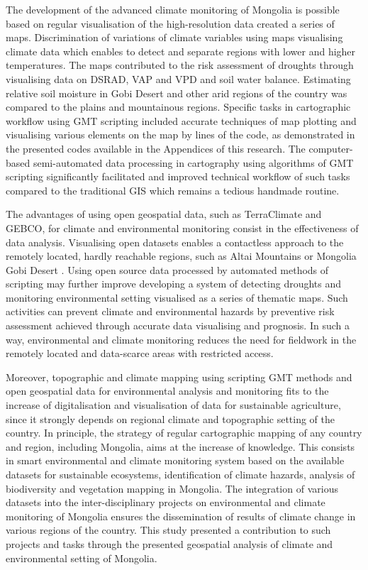 \documentclass[geosciences,article,submit,pdftex,moreauthors]{Definitions/mdpi}
\begin{document}
The development of the advanced climate monitoring of Mongolia is possible based on regular visualisation of the high-resolution data created a series of maps. Discrimination of variations of climate variables using maps visualising climate data which enables to detect and separate regions with lower and higher temperatures. The maps contributed to the risk assessment of droughts through visualising data on DSRAD, VAP and VPD and soil water balance. Estimating relative soil moisture in Gobi Desert and other arid regions of the country was compared to the plains and mountainous regions. Specific tasks in cartographic workflow using GMT scripting included accurate techniques of map plotting and visualising various elements on the map by lines of the code, as demonstrated in the presented codes available in the Appendices of this research. The computer-based semi-automated data processing in cartography using algorithms of GMT scripting significantly facilitated and improved technical workflow of such tasks compared to the traditional GIS which remains a tedious handmade routine. 

The advantages of using open geospatial data, such as TerraClimate and GEBCO, for climate and environmental monitoring consist in the effectiveness of data analysis. Visualising open datasets enables a contactless approach to the remotely located, hardly reachable regions, such as Altai Mountains or Mongolia Gobi Desert \cite{HEINER202078}. Using open source data processed by automated methods of scripting may further improve developing a system of detecting droughts and monitoring environmental setting visualised as a series of thematic maps. Such activities can prevent climate and environmental hazards by preventive risk assessment achieved through accurate data visualising and prognosis. In such a way, environmental and climate monitoring reduces the need for fieldwork in the remotely located and data-scarce areas with restricted access.

Moreover, topographic and climate mapping using scripting GMT methods and open geospatial data for environmental analysis and monitoring fits to the increase of digitalisation and visualisation of data for sustainable agriculture, since it strongly depends on regional climate and topographic setting of the country. In principle, the strategy of regular cartographic mapping of any country and region, including Mongolia, aims at the increase of knowledge. This consists in smart environmental and climate monitoring system based on the available datasets for sustainable ecosystems, identification of climate hazards, analysis of biodiversity and vegetation mapping in Mongolia. The integration of various datasets into the inter-disciplinary projects on environmental and climate monitoring of Mongolia ensures the dissemination of results of climate change in various regions of the country. This study presented a contribution to such projects and tasks through the presented geospatial analysis of climate and environmental setting of Mongolia.
\end{document}

